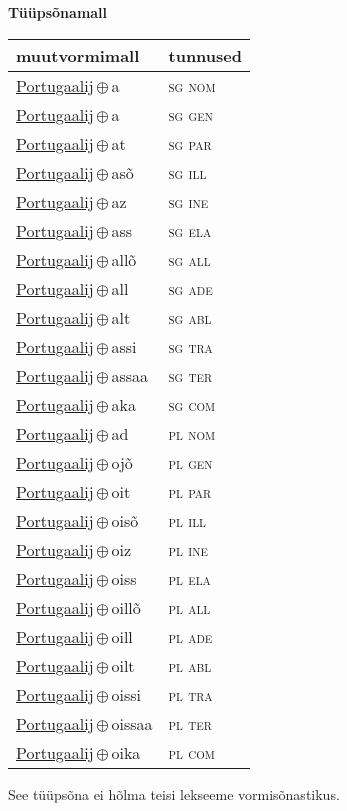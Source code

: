 

\vspace{3.5em}
\noindent \begin{minipage}{\textwidth}
\noindent \textbf{Tüüpsõnamall \,}\\

\begin{sideways}
\begin{tabular}{l l}
muutvormimall & tunnused \\
\hline
\underline{Portugaalij}\,$\oplus$\,a & \textsc{ sg nom } \\
\underline{Portugaalij}\,$\oplus$\,a & \textsc{ sg gen } \\
\underline{Portugaalij}\,$\oplus$\,at & \textsc{ sg par } \\
\underline{Portugaalij}\,$\oplus$\,asõ & \textsc{ sg ill } \\
\underline{Portugaalij}\,$\oplus$\,az & \textsc{ sg ine } \\
\underline{Portugaalij}\,$\oplus$\,ass & \textsc{ sg ela } \\
\underline{Portugaalij}\,$\oplus$\,allõ & \textsc{ sg all } \\
\underline{Portugaalij}\,$\oplus$\,all & \textsc{ sg ade } \\
\underline{Portugaalij}\,$\oplus$\,alt & \textsc{ sg abl } \\
\underline{Portugaalij}\,$\oplus$\,assi & \textsc{ sg tra } \\
\underline{Portugaalij}\,$\oplus$\,assaa & \textsc{ sg ter } \\
\underline{Portugaalij}\,$\oplus$\,aka & \textsc{ sg com } \\
\underline{Portugaalij}\,$\oplus$\,ad & \textsc{ pl nom } \\
\underline{Portugaalij}\,$\oplus$\,ojõ & \textsc{ pl gen } \\
\underline{Portugaalij}\,$\oplus$\,oit & \textsc{ pl par } \\
\underline{Portugaalij}\,$\oplus$\,oisõ & \textsc{ pl ill } \\
\underline{Portugaalij}\,$\oplus$\,oiz & \textsc{ pl ine } \\
\underline{Portugaalij}\,$\oplus$\,oiss & \textsc{ pl ela } \\
\underline{Portugaalij}\,$\oplus$\,oillõ & \textsc{ pl all } \\
\underline{Portugaalij}\,$\oplus$\,oill & \textsc{ pl ade } \\
\underline{Portugaalij}\,$\oplus$\,oilt & \textsc{ pl abl } \\
\underline{Portugaalij}\,$\oplus$\,oissi & \textsc{ pl tra } \\
\underline{Portugaalij}\,$\oplus$\,oissaa & \textsc{ pl ter } \\
\underline{Portugaalij}\,$\oplus$\,oika & \textsc{ pl com } \\
\end{tabular}
\end{sideways}
\label{tab:tüüpsõnamall-portugaalija}

\end{minipage}

 
\vspace{1em}
\noindent See tüüpsõna ei hõlma teisi lekseeme vormi\-sõnastikus.
